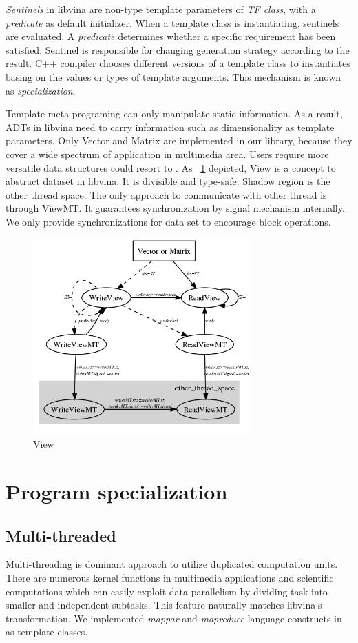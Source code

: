 \documentclass[10pt, conference, compsocconf]{IEEEtran}
\begin{document}
\emph{Sentinels} in libvina are non-type template parameters of \emph{TF class}, with a \emph{predicate} as default initializer. When a template class is instantiating, sentinels are evaluated.  A \emph{predicate} determines whether a specific requirement has been satisfied. Sentinel is responsible for changing generation strategy according to the result. C++ compiler chooses different versions of a template class to instantiates basing on the values or types of template arguments. This mechanism is known as \emph{specialization}.

Template meta-programing can only manipulate static information. As a result, ADTs in libvina need to carry information such as dimensionality as template parameters. Only Vector and Matrix are implemented in our library, because they cover a wide spectrum of application in multimedia area. Users require more versatile data structures could resort to \cite{b10}. As ~\ref{fig:view} depicted, View is a concept to abstract dataset in libvina. It is divisible and type-safe. Shadow region is the other thread space. The only approach to communicate with other thread is through ViewMT. It guarantees synchronization by signal mechanism internally. We only provide synchronizations for data set to encourage block operations.  

\begin{figure}
\includegraphics[width=3.3in]{view_concept}
\caption{View}
\label{fig:view}
\end{figure}

%
\section{Program specialization}
\subsection{Multi-threaded}
Multi-threading is dominant approach to utilize duplicated computation units.  There are numerous kernel functions in multimedia applications and scientific computations which can easily exploit data parallelism by dividing task into smaller and independent subtasks. This feature naturally matches libvina's transformation. We implemented \emph{mappar} and \emph{mapreduce} language constructs in \cite{b1} as template classes. 
\end{document}
